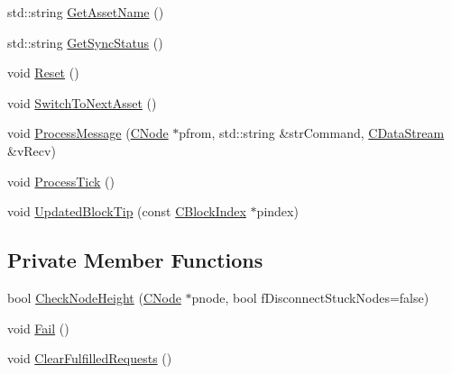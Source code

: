 \begin{DoxyCompactItemize}
\item 
std\+::string \mbox{\hyperlink{class_c_masternode_sync_a28b553349ba9d61d1521cbd38d98fa92}{Get\+Asset\+Name}} ()
\item 
std\+::string \mbox{\hyperlink{class_c_masternode_sync_ac95f70e4b942ac8533a064f3fdc45ba4}{Get\+Sync\+Status}} ()
\item 
void \mbox{\hyperlink{class_c_masternode_sync_a10c27866eb1d20c317a34fbde3fe1ef3}{Reset}} ()
\item 
void \mbox{\hyperlink{class_c_masternode_sync_acc55d29b02fdd2def68d67d7ccaae741}{Switch\+To\+Next\+Asset}} ()
\item 
void \mbox{\hyperlink{class_c_masternode_sync_a06209bd466ed87b191d8d9883fce984f}{Process\+Message}} (\mbox{\hyperlink{class_c_node}{C\+Node}} $\ast$pfrom, std\+::string \&str\+Command, \mbox{\hyperlink{class_c_data_stream}{C\+Data\+Stream}} \&v\+Recv)
\item 
void \mbox{\hyperlink{class_c_masternode_sync_a6a26e27525f1c0460e6f52a758f49737}{Process\+Tick}} ()
\item 
void \mbox{\hyperlink{class_c_masternode_sync_a6d9d82c24c73d6675e7947523875f120}{Updated\+Block\+Tip}} (const \mbox{\hyperlink{class_c_block_index}{C\+Block\+Index}} $\ast$pindex)
\end{DoxyCompactItemize}
\subsection*{Private Member Functions}
\begin{DoxyCompactItemize}
\item 
bool \mbox{\hyperlink{class_c_masternode_sync_affeb3e2dec2421b91801cea5f4be1a7a}{Check\+Node\+Height}} (\mbox{\hyperlink{class_c_node}{C\+Node}} $\ast$pnode, bool f\+Disconnect\+Stuck\+Nodes=false)
\item 
void \mbox{\hyperlink{class_c_masternode_sync_a56a833e71fb387066d5e03f8ca7d0479}{Fail}} ()
\item 
void \mbox{\hyperlink{class_c_masternode_sync_a02b1bd4e5dda8f8673612208040ec082}{Clear\+Fulfilled\+Requests}} ()
\end{DoxyCompactItemize}
